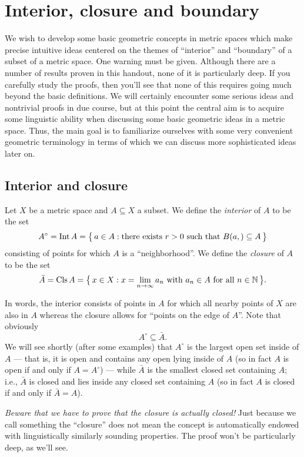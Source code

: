 \section{Interior, closure and boundary}
We wish to develop some basic geometric concepts in metric spaces which
make precise intuitive ideas centered on the themes of ``interior'' and
``boundary'' of a subset of a metric space. One warning must be
given. Although there are a number of results proven in this handout, none
of it is particularly deep. If you carefully study the proofs, then you'll
see that none of this requires going much beyond the basic definitions. We
will certainly encounter some serious ideas and nontrivial proofs in due
course, but at this point the central aim is to acquire some linguistic
ability when discussing some basic geometric ideas in a metric space. Thus,
the main goal is to familiarize ourselves with some very convenient
geometric terminology in terms of which we can discuss more sophisticated
ideas later on.
\subsection{Interior and closure}
Let \(X\) be a metric space and \(A\subseteq X\) a subset. We define the
\emph{interior} of \(A\) to be the set
\[
  A^\circ=\operatorname{Int} A=\bigl\{\,a\in A:\text{there exists \(r>0\) such that
    \(B(a,)\subseteq A\)}\,\bigr\}
\]
consisting of points for which \(A\) is a ``neighborhood''. We define the
\emph{closure}  of \(A\) to be the set
\[
  \bar A=\operatorname{Cls} A=\bigl\{\,x\in X:\text{\(x=\lim_{n\to\infty} a_n\) with
    \(a_n\in A\) for all \(n\in\mathbb{N}\)}\,\bigr\}.
\]

In words, the interior consists of points in \(A\) for which all nearby
points of \(X\) are also in \(A\) whereas the closure allows for ``points
on the edge of \(A\)''. Note that obviously
\[
  A^\circ\subseteq\bar A.
\]
We will see shortly (after some examples) that \(A^\circ\) is the largest
open set inside of \(A\) --- that is, it is open and contains any open
lying inside of \(A\) (so in fact \(A\) is open if and only if
\(A=A^\circ\)) --- while \(\bar A\) is the smallest closed set containing
\(A\); i.e., \(\bar A\) is closed and lies inside any closed set containing
\(A\) (so  in fact \(A\) is closed if and only if \(\bar A=A\)).

\emph{Beware that we have to prove that the closure is actually closed!}
Just because we call  something the ``closure'' does not mean the concept
is automatically endowed with linguistically similarly sounding
properties. The proof won't be particularly deep, as we'll see.

